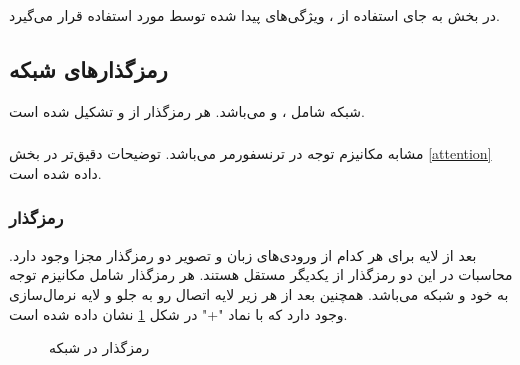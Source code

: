 در بخش 
به جای استفاده از
، ویژگی‌های پیدا شده توسط 
\cite{ren15fasterrcnn}
مورد استفاده قرار می‌گیرد.

\subsection{رمزگذارهای شبکه}
شبکه
شامل
،
و
می‌باشد. هر رمزگذار از 
و 
تشکیل شده است.

\subsubsection{}
مشابه مکانیزم توجه
در ترنسفورمر می‌باشد. توضیحات دقیق‌تر در بخش \ref{attention} داده شده است.

\subsubsection{رمزگذار
	}
بعد از لایه 
برای هر کدام از ورودی‌های زبان و تصویر دو رمزگذار
مجزا وجود دارد. محاسبات در این دو رمزگذار از یکدیگر مستقل هستند. هر رمزگذار شامل مکانیزم توجه به خود
و شبکه 
می‌باشد. همچنین بعد از هر زیر لایه اتصال رو به جلو
و لایه نرمال‌سازی
 وجود دارد که با نماد "+" در شکل
\ref{lxmert-single-encoder}
 نشان داده شده است.

\begin{figure}[H]
	\caption{رمزگذار 
		در شبکه
		 \cite{tan2019lxmert}}
	\label{lxmert-single-encoder}
\end{figure}
\newpage
